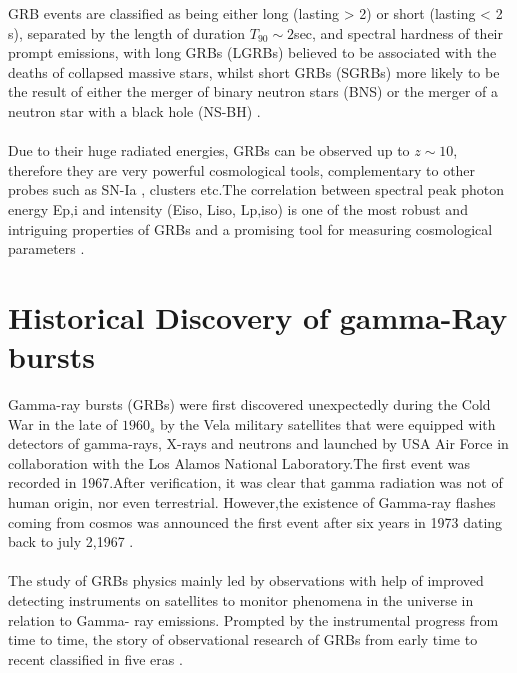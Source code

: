 GRB  events are  classified   as being  either  long  (lasting > 2) or short (lasting < 2 s), separated  by  the length  of duration $T_{90} \sim 2 $sec, and  spectral hardness of their prompt emissions, with long  GRBs (LGRBs) believed to be associated with the  deaths of collapsed  massive  stars, whilst  short  GRBs (SGRBs) more likely to be  the  result of  either  the  merger of  binary  neutron  stars (BNS) or the  merger  of  a neutron  star  with  a black  hole (NS-BH) \citep{3}.\\\\
Due to their huge radiated energies, GRBs can be observed up to $z  \sim 10$, therefore they are very powerful cosmological tools, complementary to other probes such as SN-Ia , clusters etc.The correlation between spectral peak photon energy Ep,i and intensity (Eiso, Liso, Lp,iso) is one of the most robust and intriguing properties of GRBs and a promising tool for measuring cosmological parameters \citep{2, 3}.
\section{Historical Discovery of gamma-Ray bursts }
Gamma-ray bursts (GRBs) were first discovered unexpectedly during the Cold War
in the late of $1960_{s}$  by the Vela military satellites that  were equipped with detectors of gamma-rays, X-rays and neutrons and launched by USA Air Force in collaboration with the Los Alamos National Laboratory.The first event was recorded in 1967.After verification, it was clear that gamma radiation was not of human origin, nor even terrestrial. However,the existence of Gamma-ray flashes coming from cosmos was  announced the first event after six years in 1973 dating back to july 2,1967       \citep{4}.\\\\ 
The study of GRBs physics mainly led by observations with help of improved detecting instruments on satellites to monitor phenomena in the universe in relation to  Gamma- ray emissions.  Prompted by the instrumental progress from time to time, the story of observational research of GRBs from early time to recent  classified in five eras  \citep{4} \citep { 5}.\\\\
